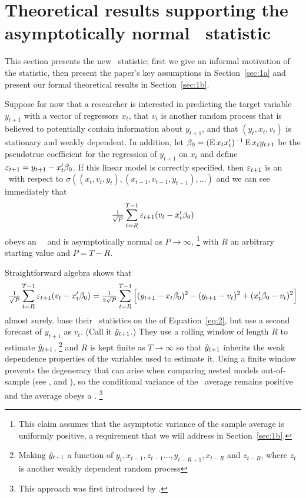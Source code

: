 \section[Asymptotic normality]{Theoretical results supporting the asymptotically normal \oos\ statistic}
\label{sec:1}

This section presents the new \oos\ statistic; first we give an
informal motivation of the statistic, then present the paper's key
assumptions in Section~\ref{sec:1a} and present our formal theoretical
results in Section~\ref{sec:1b}.

Suppose for now that a researcher is interested in
predicting the target variable $y_{t+1}$ with a vector of regressors
$x_t$, that $v_t$ is another random process that is believed to
potentially contain information about $y_{t+1}$, and that
$(y_t, x_t, v_t)$ is stationary and weakly dependent.
In addition,
let $\btrue = (\E x_t x_t')^{-1} \E x_t y_{t+1}$ be the pseudotrue
coefficient for the regression of $y_{t+1}$ on $x_t$ and define
$\ep_{t+1} = y_{t+1} - x_t'\btrue$.  If this linear model is
correctly specified, then $\varepsilon_{t+1}$ is an \mds\ with respect
to $\sigma((x_t, v_t, y_t), (x_{t-1}, v_{t-1}, y_{t-1}),\dots)$
and we can see immediately that
\begin{equation}
  \label{eq:1}
  \oclt{t} \ep_{t+1} (v_t - x_t'\btrue)
\end{equation}
obeys an \mds\ \clt\ and is asymptotically normal as $P \to \infty$,%
\footnote{This claim assumes that the asymptotic variance of the
  sample average is uniformly positive, a requirement that we will
  address in Section~\ref{sec:1b}.} %
with $R$ an arbitrary starting value
and $P = T - R$.

Straightforward algebra \citep{ClW:07} shows that
\begin{equation}
  \label{eq:2}
  \tfrac{1}{\sqrt{P}} \osum{t} \ep_{t+1} (v_t -
  x_t'\btrue) = \tfrac{1}{2 \sqrt{P}} \osum{t} \Big[(y_{t+1} -
  x_t\btrue)^2 - (y_{t+1} - v_t)^2 + (x_t'\btrue - v_t)^2 \Big]
\end{equation}
almost surely.
\citet{ClW:06,ClW:07} base their \oos\ statistics on the  of
Equation~\eqref{eq:2}, but use a second forecast of $y_{t+1}$ as
$v_t$. (Call it $\hat{y}_{t+1}$.) They use a rolling window of length
$R$ to estimate $\hat{y}_{t+1}$,%
\footnote{Making $\hat{y}_{t+1}$ a function of $y_t, x_{t-1}, z_{t-1}
\dots, y_{t-R+1}, x_{t-R}$ and $z_{t-R}$, where $z_t$ is another weakly
dependent random process} %
and $R$ is kept finite as $T \to \infty$ so that
$\hat{y}_{t+1}$ inherits the weak dependence properties of the
variables used to estimate it. Using a finite window prevents
the degeneracy that can arise when comparing nested models out-of-sample (see
\citealp{ClM:01}, and \citealp{Mcc:07}), so the conditional variance
of the \oos\ average remains positive and the average obeys a \clt.%
\footnote{This approach was first introduced by \citet{GiW:06}.} %

